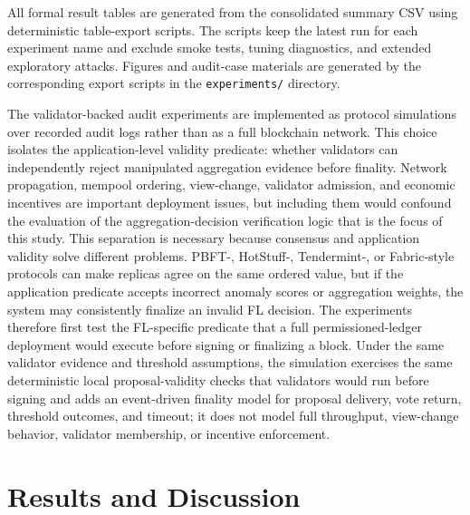 \documentclass[preprint,12pt]{elsarticle}
\begin{document}
All formal result tables are generated from the consolidated summary CSV using deterministic table-export scripts. The scripts keep the latest run for each experiment name and exclude smoke tests, tuning diagnostics, and extended exploratory attacks. Figures and audit-case materials are generated by the corresponding export scripts in the \texttt{experiments/} directory.

The validator-backed audit experiments are implemented as protocol simulations over recorded audit logs rather than as a full blockchain network. This choice isolates the application-level validity predicate: whether validators can independently reject manipulated aggregation evidence before finality. Network propagation, mempool ordering, view-change, validator admission, and economic incentives are important deployment issues, but including them would confound the evaluation of the aggregation-decision verification logic that is the focus of this study. This separation is necessary because consensus and application validity solve different problems. PBFT-, HotStuff-, Tendermint-, or Fabric-style protocols can make replicas agree on the same ordered value, but if the application predicate accepts incorrect anomaly scores or aggregation weights, the system may consistently finalize an invalid FL decision. The experiments therefore first test the FL-specific predicate that a full permissioned-ledger deployment would execute before signing or finalizing a block. Under the same validator evidence and threshold assumptions, the simulation exercises the same deterministic local proposal-validity checks that validators would run before signing and adds an event-driven finality model for proposal delivery, vote return, threshold outcomes, and timeout; it does not model full throughput, view-change behavior, validator membership, or incentive enforcement.

\section{Results and Discussion}
\end{document}
